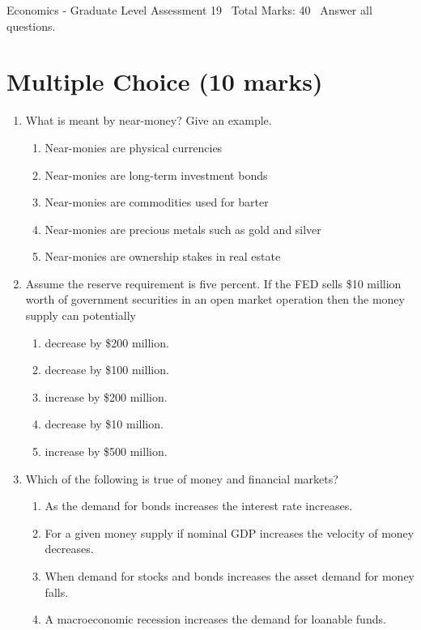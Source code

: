 \documentclass[12pt]{article}
\begin{document}
\begin{center}
Economics - Graduate Level Assessment 19 \
Total Marks: 40 \
Answer all questions.
\end{center}

\section*{Multiple Choice (10 marks)}
\begin{enumerate}[label=\arabic*.]
\item What is meant by near-money? Give an example.
\begin{enumerate}[label=(\alph*)]
    \item Near-monies are physical currencies
    \item Near-monies are long-term investment bonds
    \item Near-monies are commodities used for barter
    \item Near-monies are precious metals such as gold and silver
    \item Near-monies are ownership stakes in real estate
\end{enumerate}
\item Assume the reserve requirement is five percent. If the FED sells \$10 million worth of government securities in an open market operation then the money supply can potentially
\begin{enumerate}[label=(\alph*)]
    \item decrease by \$200 million.
    \item decrease by \$100 million.
    \item increase by \$200 million.
    \item decrease by \$10 million.
    \item increase by \$500 million.
\end{enumerate}
\item Which of the following is true of money and financial markets?
\begin{enumerate}[label=(\alph*)]
    \item As the demand for bonds increases the interest rate increases.
    \item For a given money supply if nominal GDP increases the velocity of money decreases.
    \item When demand for stocks and bonds increases the asset demand for money falls.
    \item A macroeconomic recession increases the demand for loanable funds.

\end{enumerate}
\end{enumerate}
\end{document}
